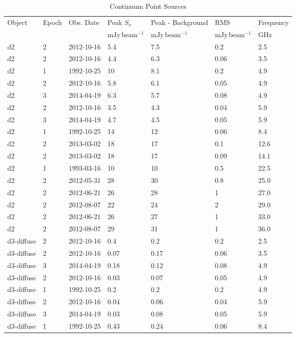 \begin{table*}[htp]
\caption{Continuum Point Sources}
\begin{tabular}{llll}
\label{tab:contsrcs_full}
Object & Epoch & Obs. Date & Peak $S_{\nu}$ & Peak - Background & RMS & Frequency \\
 &  &  & $\mathrm{mJy\,beam^{-1}}$ & $\mathrm{mJy\,beam^{-1}}$ & $\mathrm{mJy\,beam^{-1}}$ & $\mathrm{GHz}$ \\
\hline
d2 & 2 & 2012-10-16 & 5.4 & 7.5 & 0.2 & 2.5 \\
d2 & 2 & 2012-10-16 & 4.4 & 6.3 & 0.06 & 3.5 \\
d2 & 1 & 1992-10-25 & 10 & 8.1 & 0.2 & 4.9 \\
d2 & 2 & 2012-10-16 & 5.8 & 6.1 & 0.05 & 4.9 \\
d2 & 3 & 2014-04-19 & 6.3 & 5.7 & 0.08 & 4.9 \\
d2 & 2 & 2012-10-16 & 3.5 & 4.3 & 0.04 & 5.9 \\
d2 & 3 & 2014-04-19 & 4.7 & 4.5 & 0.05 & 5.9 \\
d2 & 1 & 1992-10-25 & 14 & 12 & 0.06 & 8.4 \\
d2 & 2 & 2013-03-02 & 18 & 17 & 0.1 & 12.6 \\
d2 & 2 & 2013-03-02 & 18 & 17 & 0.09 & 14.1 \\
d2 & 1 & 1993-03-16 & 10 & 10 & 0.5 & 22.5 \\
d2 & 2 & 2012-05-31 & 28 & 30 & 0.8 & 25.0 \\
d2 & 2 & 2012-06-21 & 26 & 28 & 1 & 27.0 \\
d2 & 2 & 2012-08-07 & 22 & 24 & 2 & 29.0 \\
d2 & 2 & 2012-06-21 & 26 & 27 & 1 & 33.0 \\
d2 & 2 & 2012-08-07 & 29 & 31 & 1 & 36.0 \\
d3-diffuse & 2 & 2012-10-16 & 0.4 & 0.2 & 0.2 & 2.5 \\
d3-diffuse & 2 & 2012-10-16 & 0.07 & 0.17 & 0.06 & 3.5 \\
d3-diffuse & 3 & 2014-04-19 & 0.18 & 0.12 & 0.08 & 4.9 \\
d3-diffuse & 2 & 2012-10-16 & 0.03 & 0.07 & 0.05 & 4.9 \\
d3-diffuse & 1 & 1992-10-25 & 0.2 & 0.2 & 0.2 & 4.9 \\
d3-diffuse & 2 & 2012-10-16 & 0.04 & 0.06 & 0.04 & 5.9 \\
d3-diffuse & 3 & 2014-04-19 & 0.03 & 0.08 & 0.05 & 5.9 \\
d3-diffuse & 1 & 1992-10-25 & 0.43 & 0.24 & 0.06 & 8.4 \\

\end{tabular}
\end{table*}
